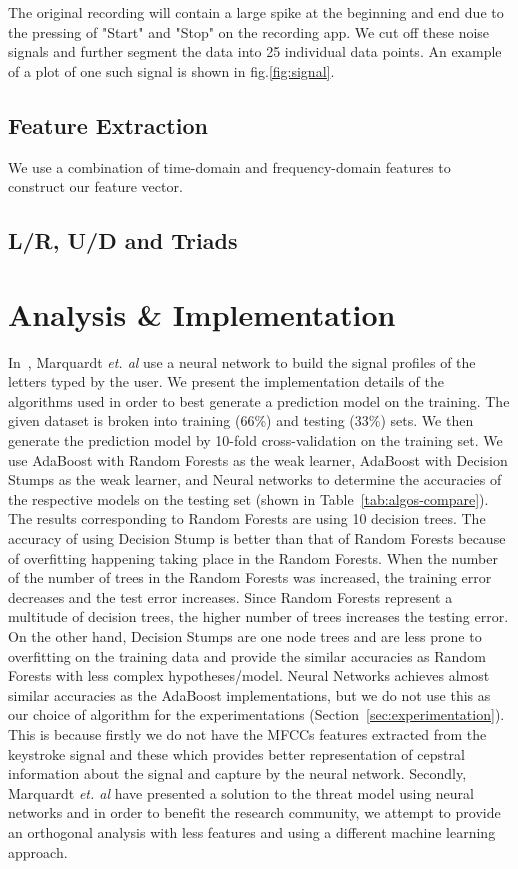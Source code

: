 \documentclass[11pt,conference]{IEEEtran}
\begin{document}
The original recording will contain a large spike at the beginning and end due to the pressing of "Start" and "Stop" on the recording app. We cut off these noise signals and further segment the data into 25 individual data points. An example of a plot of one such signal is shown in fig.\ref{fig:signal}.

\subsection{Feature Extraction}

We use a combination of time-domain and frequency-domain features to construct our feature vector. 

\subsection{L/R, U/D and Triads}

\section{Analysis \& Implementation}
\label{sec:implementation}
\noindent In~\cite{spiphone}, Marquardt \emph{et. al} use a neural network to build the signal profiles of the letters typed by the user. We present the implementation details of the algorithms used in order to best generate a prediction model on the training. The given dataset is broken into training (66\%) and testing (33\%) sets. We then generate the prediction model by 10-fold cross-validation on the training set. We use AdaBoost with Random Forests as the weak learner, AdaBoost with Decision Stumps as the weak learner, and Neural networks to determine the accuracies of the respective models on the testing set (shown in Table~\ref{tab:algos-compare}). The results corresponding to Random Forests are using 10 decision trees. The accuracy of using Decision Stump is better than that of Random Forests because of overfitting happening taking place in the Random Forests. When the number of the number of trees in the Random Forests was increased, the training error decreases and the test error increases. Since Random Forests represent a multitude of decision trees, the higher number of trees increases the testing error. On the other hand, Decision Stumps are one node trees and are less prone to overfitting on the training data and provide the similar accuracies as Random Forests with less complex hypotheses/model. Neural Networks achieves almost similar accuracies as the AdaBoost implementations, but we do not use this as our choice of algorithm for the experimentations (Section~\ref{sec:experimentation}). This is because firstly we do not have the MFCCs features extracted from the keystroke signal and these which provides better representation of cepstral information about the signal and capture by the neural network. Secondly, Marquardt \emph{et. al} have presented a solution to the threat model using neural networks and in order to benefit the research community, we attempt to provide an orthogonal analysis with less features and using a different machine learning approach.
\end{document}
